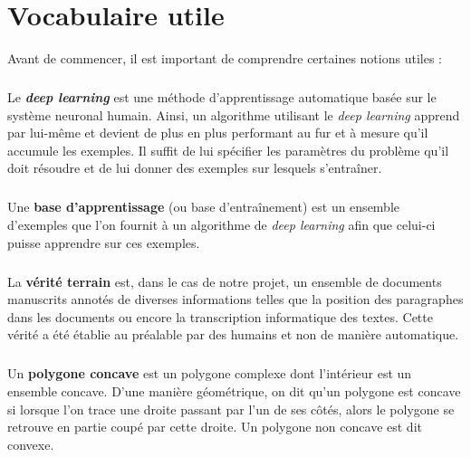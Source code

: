 \chapter{Vocabulaire utile}

Avant de commencer, il est important de comprendre certaines notions utiles :

\paragraph{}
Le \textbf{\textit{deep learning}} est une méthode d’apprentissage automatique
basée sur le système neuronal humain. Ainsi, un algorithme utilisant le \textit{deep learning}
apprend par lui-même et devient de plus en plus performant au fur et à mesure qu’il accumule
les exemples. Il suffit de lui spécifier les paramètres du problème qu’il doit résoudre et de
lui donner des exemples sur lesquels s’entraîner.

\paragraph{}
Une \textbf{base d’apprentissage} (ou base d'entraînement) est un ensemble d’exemples
que l’on fournit à un algorithme de \textit{deep learning} afin que celui-ci puisse apprendre
sur ces exemples.

\paragraph{}
La \textbf{vérité terrain} est, dans le cas de notre projet, un ensemble de documents manuscrits
annotés de diverses informations telles que la position des paragraphes dans les documents ou encore la
transcription informatique des textes. Cette vérité a été établie au préalable par des humains et non
de manière automatique.

\paragraph{}
Un \textbf{polygone concave} est un polygone complexe dont l’intérieur est un ensemble concave.
D'une manière géométrique, on dit qu'un polygone est concave si lorsque l'on trace une droite passant
par l’un de ses côtés, alors le polygone se retrouve en partie coupé par cette droite.
Un polygone non concave est dit convexe.

